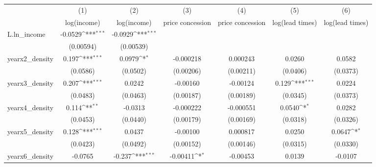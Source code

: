 {
\def\sym#1{\ifmmode^{#1}\else\(^{#1}\)\fi}
\begin{tabular}{l*{6}{c}}
\toprule
            &\multicolumn{1}{c}{(1)}&\multicolumn{1}{c}{(2)}&\multicolumn{1}{c}{(3)}&\multicolumn{1}{c}{(4)}&\multicolumn{1}{c}{(5)}&\multicolumn{1}{c}{(6)}\\
            &\multicolumn{1}{c}{log(income)}&\multicolumn{1}{c}{log(income)}&\multicolumn{1}{c}{price concession}&\multicolumn{1}{c}{price concession}&\multicolumn{1}{c}{log(lead times)}&\multicolumn{1}{c}{log(lead times)}\\
\midrule
L.ln\_income &     -0.0529\sym{***}&     -0.0929\sym{***}&                     &                     &                     &                     \\
            &   (0.00594)         &   (0.00539)         &                     &                     &                     &                     \\
\addlinespace
yearx2\_density&       0.197\sym{***}&      0.0979\sym{*}  &   -0.000218         &    0.000243         &      0.0260         &      0.0582         \\
            &    (0.0586)         &    (0.0502)         &   (0.00206)         &   (0.00211)         &    (0.0406)         &    (0.0373)         \\
\addlinespace
yearx3\_density&       0.207\sym{***}&      0.0242         &    -0.00160         &    -0.00124         &       0.129\sym{***}&      0.0224         \\
            &    (0.0483)         &    (0.0463)         &   (0.00187)         &   (0.00189)         &    (0.0345)         &    (0.0373)         \\
\addlinespace
yearx4\_density&       0.114\sym{**} &     -0.0313         &   -0.000222         &   -0.000551         &      0.0540\sym{*}  &      0.0282         \\
            &    (0.0453)         &    (0.0440)         &   (0.00179)         &   (0.00169)         &    (0.0318)         &    (0.0326)         \\
\addlinespace
yearx5\_density&       0.128\sym{***}&      0.0437         &    -0.00100         &    0.000817         &      0.0250         &      0.0647\sym{*}  \\
            &    (0.0423)         &    (0.0492)         &   (0.00152)         &   (0.00146)         &    (0.0315)         &    (0.0330)         \\
\addlinespace
yearx6\_density&     -0.0765         &      -0.237\sym{***}&    -0.00411\sym{*}  &    -0.00453         &      0.0139         &     -0.0107         \\

\end{tabular}}
